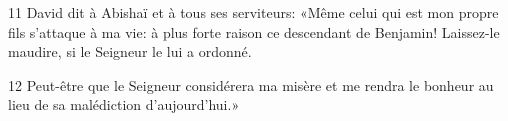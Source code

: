 
11 David dit à Abishaï et à tous ses serviteurs: «Même celui qui est mon propre fils s’attaque à ma vie: à plus forte raison ce descendant de Benjamin! Laissez-le maudire, si le Seigneur le lui a ordonné.

12 Peut-être que le Seigneur considérera ma misère et me rendra le bonheur au lieu de sa malédiction d’aujourd’hui.»
